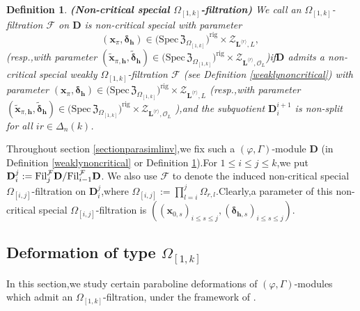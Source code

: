 \documentclass[SecEq,CM,GP]{degruyter-crelle} %
\theoremstyle{plain}
\newtheorem{dfn}[thm]{Definition}
\newcommand{\bmdel}{{ \bm{\delta}_\bh}}
\newcommand{\Dpik}{{\mathbf{D}}}
\newcommand{\fil}{{\rm Fil}}
\newcommand{\lrr}{{\langle r\rangle}}
\newcommand{\omepik}{\Omega_{[1,k]}}
\newcommand{\rigch}{{\mathcal{Z}_{\bL^{\lrr},\mathcal{O}_L}}}
\newcommand{\rigchl}{{\mathcal{Z}_{\bL^{\lrr},L}}}
\newcommand{\sbanpik}{{\big(\mathrm{Spec}\hspace{2pt}\mathfrak{Z}_{\omepik}\big)^{\mathrm{rig}}}}
\newcommand{\bL}{{\mathbf{L}}}
\newcommand{\bx}{{\mathbf{x}}}
\newcommand{\bh}{{\mathbf{h}}}
\newcommand{\cF}{\mathcal F}
\begin{document}
\begin{dfn}\label{dfnnoncriticalspecial}\textbf{(Non-critical special $\omepik$-filtration)} We call an $\omepik$-filtration $\cF$ on $\Dpik$ is non-critical special with parameter $$(\bx_{\pi},\bmdel)\in \sbanpik\times\rigchl ,\;$$(resp.,\;with parameter $(\widetilde{\bx}_{\pi,\bh},\widetilde{\bm{\delta}}_\bh)\in \sbanpik\times\rigch $)\;if\;$\Dpik$ admits a  non-critical special weakly $\omepik$-filtration $\cF$ (see Definition \ref{weaklynoncritical}) with parameter $(\bx_{\pi},\bmdel)\in \sbanpik\times\rigchl $ (resp.,\;with parameter $(\widetilde{\bx}_{\pi,\bh},\widetilde{\bm{\delta}}_\bh)\in \sbanpik\times\rigch $ ),\;and the subquotient $\Dpik^{i+1}_{i}$ is non-split for all $ir\in\Delta_n(k)$.\; %
\end{dfn}

Throughout section \ref{sectionparasimlinv},\;we fix such a $(\varphi,\Gamma)$-module $\Dpik$ (in Definition  \ref{weaklynoncritical} or Definition \ref{dfnnoncriticalspecial}).\;For $1\leq i\leq j\leq k$,\;we put $\Dpik^{j}_i:=\fil_j^{\cF}\Dpik/\fil_{i-1}^{\cF}\Dpik$. We also use $\cF$ to denote the induced non-critical special $\Omega_{[i,j]}$-filtration on $\Dpik^{j}_i$,\;where $\Omega_{[i,j]}:=\prod_{l=i}^j\Omega_{r,l}$.\;Clearly,\;a parameter of this non-critical special  $\Omega_{[i,j]}$-filtration is $((\bx_{0,s})_{i\leq s\leq j},(\bm{\delta}_{\bh,s})_{i\leq s\leq j})$.\;




\subsection{Deformation of type \texorpdfstring{$\omepik$}{Lg}}\label{defdfnomepik}\label{dfndeftyoeomega}

In this section,\;we study certain paraboline deformations of $(\varphi,\Gamma)$-modules which admit an $\omepik$-filtration, under the framework of \cite[Section 4.1]{Ding2021}.\;
\end{document}
